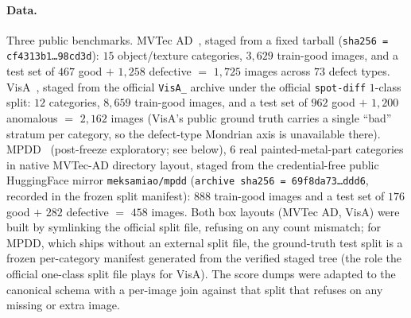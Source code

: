 \documentclass[11pt]{article}
\begin{document}
\paragraph{Data.} Three public benchmarks. MVTec AD~\citep{bergmann2019mvtec}, staged from a fixed
tarball (\texttt{sha256\,=\,cf4313b1\allowbreak\ldots98cd3d}): $15$ object/texture categories, $3{,}629$
train-good images, and a test set of $467$ good $+$ $1{,}258$ defective $=$ $1{,}725$ images
across $73$ defect types. VisA~\citep{zou2022spot}, staged from the official
\texttt{VisA\_} archive under the official \texttt{spot-diff} $1$-class split:
$12$ categories, $8{,}659$ train-good images, and a test set of $962$ good
$+$ $1{,}200$ anomalous $=$ $2{,}162$ images (VisA's public ground truth carries a single
``bad'' stratum per category, so the defect-type Mondrian axis is unavailable there). MPDD~\citep{jezek2021mpdd}
(post-freeze exploratory; see below), $6$ real painted-metal-part categories in native MVTec-AD
directory layout, staged from the credential-free public HuggingFace mirror \texttt{meksamiao/mpdd}
(\texttt{archive\ sha256\,=\,69f8da73\allowbreak\ldots ddd6}, recorded in the frozen split manifest):
$888$ train-good images and a test set of $176$ good $+$ $282$ defective $=$ $458$ images. Both box
layouts (MVTec AD, VisA) were built by symlinking the official split file,
refusing on any count mismatch; for MPDD, which ships without an external split file, the ground-truth
test split is a frozen per-category manifest generated from the verified staged tree (the role
the official one-class split file plays for VisA). The score dumps were adapted to the canonical schema with a
per-image join against that split that refuses on any missing or extra image.
\end{document}
